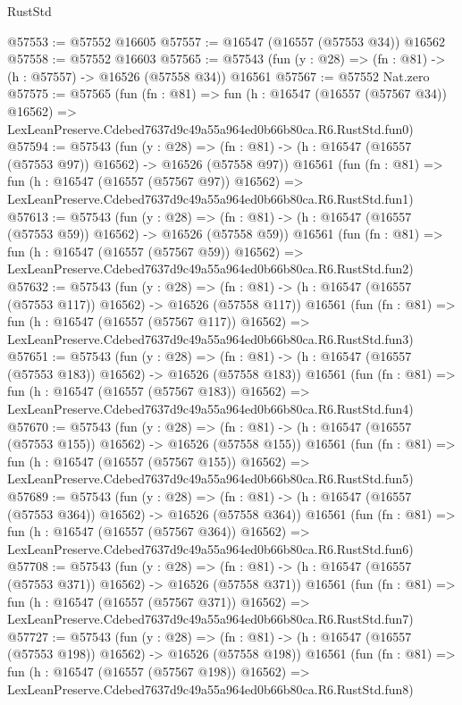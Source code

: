 \begin{lexlean}{RustStd}
\begin{coremodule}
@57553 := @57552 @16605
@57557 := @16547 (@16557 (@57553 @34)) @16562
@57558 := @57552 @16603
@57565 := @57543 (fun (y : @28) => (fn : @81) -> (h : @57557) -> @16526 (@57558 @34)) @16561
@57567 := @57552 Nat.zero
@57575 := @57565
    (fun (fn : @81) =>
    fun (h : @16547 (@16557 (@57567 @34)) @16562) =>
    LexLeanPreserve.Cdebed7637d9c49a55a964ed0b66b80ca.R6.RustStd.fun0)
@57594 := @57543
    (fun (y : @28) =>
    (fn : @81) -> (h : @16547 (@16557 (@57553 @97)) @16562) -> @16526 (@57558 @97))
    @16561
    (fun (fn : @81) =>
    fun (h : @16547 (@16557 (@57567 @97)) @16562) =>
    LexLeanPreserve.Cdebed7637d9c49a55a964ed0b66b80ca.R6.RustStd.fun1)
@57613 := @57543
    (fun (y : @28) =>
    (fn : @81) -> (h : @16547 (@16557 (@57553 @59)) @16562) -> @16526 (@57558 @59))
    @16561
    (fun (fn : @81) =>
    fun (h : @16547 (@16557 (@57567 @59)) @16562) =>
    LexLeanPreserve.Cdebed7637d9c49a55a964ed0b66b80ca.R6.RustStd.fun2)
@57632 := @57543
    (fun (y : @28) =>
    (fn : @81) -> (h : @16547 (@16557 (@57553 @117)) @16562) -> @16526 (@57558 @117))
    @16561
    (fun (fn : @81) =>
    fun (h : @16547 (@16557 (@57567 @117)) @16562) =>
    LexLeanPreserve.Cdebed7637d9c49a55a964ed0b66b80ca.R6.RustStd.fun3)
@57651 := @57543
    (fun (y : @28) =>
    (fn : @81) -> (h : @16547 (@16557 (@57553 @183)) @16562) -> @16526 (@57558 @183))
    @16561
    (fun (fn : @81) =>
    fun (h : @16547 (@16557 (@57567 @183)) @16562) =>
    LexLeanPreserve.Cdebed7637d9c49a55a964ed0b66b80ca.R6.RustStd.fun4)
@57670 := @57543
    (fun (y : @28) =>
    (fn : @81) -> (h : @16547 (@16557 (@57553 @155)) @16562) -> @16526 (@57558 @155))
    @16561
    (fun (fn : @81) =>
    fun (h : @16547 (@16557 (@57567 @155)) @16562) =>
    LexLeanPreserve.Cdebed7637d9c49a55a964ed0b66b80ca.R6.RustStd.fun5)
@57689 := @57543
    (fun (y : @28) =>
    (fn : @81) -> (h : @16547 (@16557 (@57553 @364)) @16562) -> @16526 (@57558 @364))
    @16561
    (fun (fn : @81) =>
    fun (h : @16547 (@16557 (@57567 @364)) @16562) =>
    LexLeanPreserve.Cdebed7637d9c49a55a964ed0b66b80ca.R6.RustStd.fun6)
@57708 := @57543
    (fun (y : @28) =>
    (fn : @81) -> (h : @16547 (@16557 (@57553 @371)) @16562) -> @16526 (@57558 @371))
    @16561
    (fun (fn : @81) =>
    fun (h : @16547 (@16557 (@57567 @371)) @16562) =>
    LexLeanPreserve.Cdebed7637d9c49a55a964ed0b66b80ca.R6.RustStd.fun7)
@57727 := @57543
    (fun (y : @28) =>
    (fn : @81) -> (h : @16547 (@16557 (@57553 @198)) @16562) -> @16526 (@57558 @198))
    @16561
    (fun (fn : @81) =>
    fun (h : @16547 (@16557 (@57567 @198)) @16562) =>
    LexLeanPreserve.Cdebed7637d9c49a55a964ed0b66b80ca.R6.RustStd.fun8)

\end{coremodule}
\end{lexlean}

